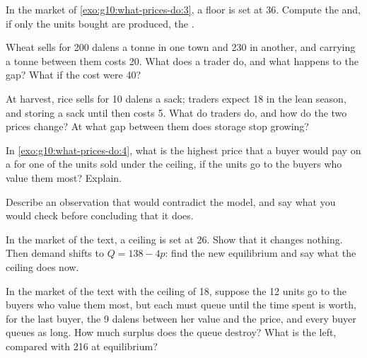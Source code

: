 \begin{exercise}[$\star\star$]\label{exo:g10:what-prices-do:8}
In the market of \cref{exo:g10:what-prices-do:3}, a floor is set at 36. Compute the  and, if only the units bought are produced, the .
\end{exercise}

\begin{exercise}[$\star\star$]\label{exo:g10:what-prices-do:9}
Wheat sells for 200 dalens a tonne in one town and 230 in another, and carrying a tonne between them costs 20. What does a trader do, and what happens to the gap? What
if the cost were 40?
\end{exercise}

\begin{exercise}[$\star\star$]\label{exo:g10:what-prices-do:10}
At harvest, rice sells for 10 dalens a sack; traders expect 18 in the lean season, and storing a sack until then costs 5. What do traders do, and how do the two prices
change? At what gap between them does storage stop growing?
\end{exercise}

\begin{exercise}[$\star\star$]\label{exo:g10:what-prices-do:11}
In \cref{exo:g10:what-prices-do:4}, what is the highest price that a buyer would pay on a  for one of the units sold under the ceiling, if the units go to
the buyers who value them most? Explain.
\end{exercise}

\begin{exercise}[$\star\star\star$]\label{exo:g10:what-prices-do:12}
Describe an observation that would contradict the  model, and say what you would check before concluding that it does.
\end{exercise}

\begin{exercise}[$\star\star\star$]\label{exo:g10:what-prices-do:13}
In the market of the text, a ceiling is set at 26. Show that it changes nothing. Then demand shifts to $Q = 138 - 4p$: find the new equilibrium and say what the
ceiling does now.
\end{exercise}

\begin{exercise}[$\star\star\star$]\label{exo:g10:what-prices-do:14}
In the market of the text with the ceiling of 18, suppose the 12 units go to the buyers who value them most, but each must queue until the time spent is worth, for
the last buyer, the 9 dalens between her value and the price, and every buyer queues as long. How much surplus does the queue destroy? What is the  left,
compared with 216 at equilibrium?
\end{exercise}


